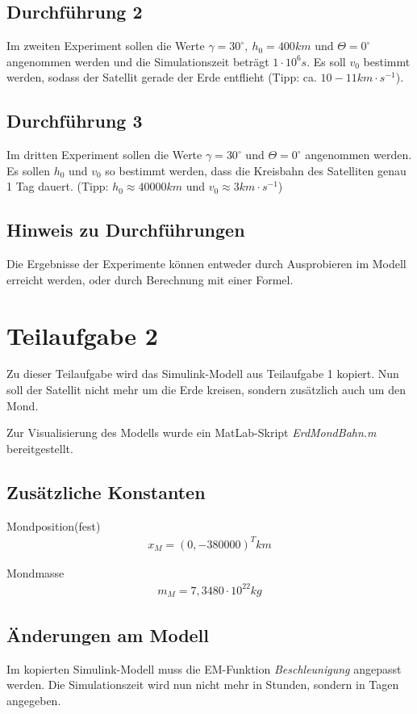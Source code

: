 \documentclass[]{scrartcl}
\begin{document}
\subsection{Durchführung 2}
Im zweiten Experiment sollen die Werte $\gamma = 30^\circ,\ h_{0} = 400km$ und $\Theta=0^\circ$ angenommen werden und die Simulationszeit beträgt $1 \cdot 10^6s$. Es soll $v_{0}$ bestimmt werden, sodass der Satellit gerade der Erde entflieht (Tipp: ca. $10 - 11 km \cdot s^{-1}$).

\subsection{Durchführung 3}
Im dritten Experiment sollen die Werte $\gamma = 30^\circ$ und $\Theta = 0^\circ$ angenommen werden. Es sollen $h_{0}$ und $v_{0}$ so bestimmt werden, dass die Kreisbahn des Satelliten genau 1 Tag dauert. (Tipp: $h_{0} \approx 40000 km$ und $v_{0} \approx 3 km \cdot s^{-1}$)

\subsection{Hinweis zu Durchführungen}
Die Ergebnisse der Experimente können entweder durch Ausprobieren im Modell erreicht werden, oder durch Berechnung mit einer Formel.

\section{Teilaufgabe 2}
Zu dieser Teilaufgabe wird das Simulink-Modell aus Teilaufgabe 1 kopiert. Nun soll der Satellit nicht mehr um die Erde kreisen, sondern zusätzlich auch um den Mond.

Zur Visualisierung des Modells wurde ein MatLab-Skript \textit{ErdMondBahn.m} bereitgestellt.

\subsection{Zusätzliche Konstanten}
Mondposition(fest)
\begin{align}
x_{M} = (0,-380000)^T km
\end{align}

Mondmasse
\begin{align}
m_{M} = 7,3480 \cdot 10^{22} kg
\end{align}

\subsection{Änderungen am Modell}
Im kopierten Simulink-Modell muss die EM-Funktion \textit{Beschleunigung} angepasst werden. %
Die Simulationszeit wird nun nicht mehr in Stunden, sondern in Tagen angegeben.
\end{document}
